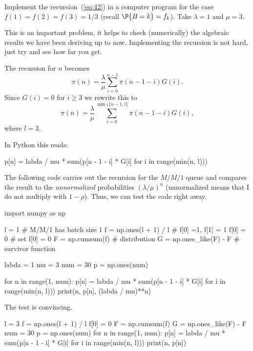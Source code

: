 \begin{exercise}
  Implement the recursion~(\ref{eq:42}) in a computer program for the
  case $f(1)=f(2)=f(3)=1/3$ (recall $\P{B=k} =f_k$). Take $\lambda =1$
  and $\mu = 3$.  
  \begin{hint}
This is an important problem, it helps to check (numerically)
    the algebraic results we have been deriving up to
    now. Implementing the recursion is not hard, just try and see how
    far you get.
  \end{hint}
  \begin{solution}
The recursion for $n$ becomes 
\begin{equation*}
\pi(n) = \frac \lambda \mu \sum_{i=0}^{n-1} \pi(n-1-i)G(i).
\end{equation*}
Since $G(i) =0$ for $i\geq 3$ we rewrite this to 
\begin{equation*}
  \pi(n) = \frac\lambda \mu \sum_{i=0}^{\min(\{n-1,l\}} \pi(n-1-i)G(i),
\end{equation*}
where $l=3$. 

In Python this reads:

\begin{pyverbatim}
p[n] = labda / mu * sum(p[n - 1 - i] * G[i] for i in range(min(n, l)))
\end{pyverbatim}

The following code carries out the recursion for the $M/M/1$ queue and compares the result to the \emph{unnormalized} probabilities $(\lambda/\mu)^n$ (unnormalized means that I do  not multiply with $1-\rho$). Thus, we can test the code right away. 

\begin{pyconsole}
import numpy as np

l = 1 # M/M/1 has batch size 1
f = np.ones(l + 1) / l # f[0] =1, f[1] = 1 
f[0] = 0 # set f[0] = 0
F = np.cumsum(f) # distribution 
G = np.ones_like(F) - F # survivor function

labda = 1
mu = 3
num = 30
p = np.ones(num)

for n in range(1, num):
    p[n] = labda / mu * sum(p[n - 1 - i] * G[i] for i in range(min(n, l)))
    print(n, p[n], (labda / mu)**n)

\end{pyconsole}
The test is convincing.

\begin{pyconsole}
l = 3
f = np.ones(l + 1) / l
f[0] = 0
F = np.cumsum(f)
G = np.ones_like(F) - F
num = 30
p = np.ones(num)
for n in range(1, num):
    p[n] = labda / mu * sum(p[n - 1 - i] * G[i] for i in range(min(n, l)))
    print(n, p[n])


\end{pyconsole}
\end{solution}
\end{exercise}
